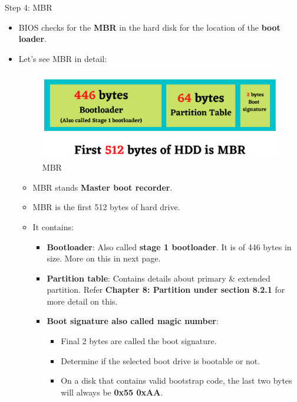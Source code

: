 \setlength{\columnsep}{3pt}
\begin{flushleft}
\bigskip
Step 4: MBR
\begin{itemize}
	\item BIOS checks for the \textbf{MBR} in the hard disk for the location of the \textbf{boot loader}.
	
	\item Let's see MBR in detail:
	\begin{figure}[h!]
		\centering
		\includegraphics[scale=0.5]{content/chapter17/images/mbr.png}
		\caption{MBR}
		\label{fig:mbr}
	\end{figure}

	\begin{itemize}	
		\item MBR stands \textbf{Master boot recorder}.
		\item MBR is the first 512 bytes of hard drive.
		\item It contains:
		\begin{itemize}
			\item \textbf{Bootloader}: Also called \textbf{stage 1 bootloader}. It is of 446 bytes in size. More on this in next page.
			\item \textbf{Partition table}: Contains details about primary \& extended partition. Refer \textbf{Chapter 8: Partition under section 8.2.1} for more detail on this.
			\item \textbf{Boot signature also called magic number}: 
			\begin{itemize}
				\item Final 2 bytes are called the boot signature.
				\item Determine if the selected boot drive is bootable or not.
				\item On a disk that contains valid bootstrap code, the last two bytes will always be \textbf{0x55 0xAA}.
			\end{itemize}
			  
		\end{itemize}
	\end{itemize}
	
\end{itemize}

	
\end{flushleft}
\newpage


